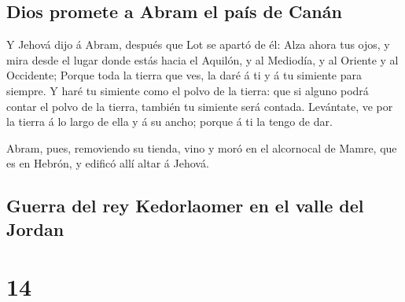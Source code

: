 \hypertarget{dios-promete-a-abram-el-pauxeds-de-canuxe1n}{%
\subsection{Dios promete a Abram el país de
Canán}\label{dios-promete-a-abram-el-pauxeds-de-canuxe1n}}

 Y Jehová dijo á Abram, después que Lot se apartó de él:
Alza ahora tus ojos, y mira desde el lugar donde estás hacia el Aquilón,
y al Mediodía, y al Oriente y al Occidente;  Porque toda
la tierra que ves, la daré á ti y á tu simiente para siempre.
 Y haré tu simiente como el polvo de la tierra: que si
alguno podrá contar el polvo de la tierra, también tu simiente será
contada.  Levántate, ve por la tierra á lo largo de ella
y á su ancho; porque á ti la tengo de dar.

 Abram, pues, removiendo su tienda, vino y moró en el
alcornocal de Mamre, que es en Hebrón, y edificó allí altar á Jehová.

\hypertarget{guerra-del-rey-kedorlaomer-en-el-valle-del-jordan}{%
\subsection{Guerra del rey Kedorlaomer en el valle del
Jordan}\label{guerra-del-rey-kedorlaomer-en-el-valle-del-jordan}}

\hypertarget{section-01-14}{%
\section{14}\label{section-01-14}}

